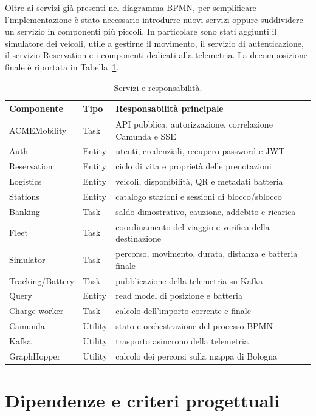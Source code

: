 \documentclass[12pt,a4paper,twoside]{report}
\begin{document}
Oltre ai servizi già presenti nel diagramma BPMN, per semplificare
l'implementazione è stato necessario introdurre nuovi servizi oppure
suddividere un servizio in componenti più piccoli. In particolare sono stati
aggiunti il simulatore dei veicoli, utile a gestirne il movimento, il servizio
di autenticazione, il servizio Reservation e i componenti dedicati alla
telemetria. La decomposizione finale è riportata in
Tabella~\ref{tab:servizi}.

\begin{table}[ht]
\centering
\small
\begin{tabularx}{\textwidth}{@{}l l X@{}}
\toprule
Componente & Tipo & Responsabilità principale \\
\midrule
ACMEMobility & Task & API pubblica, autorizzazione, correlazione Camunda e SSE \\
Auth & Entity & utenti, credenziali, recupero password e JWT \\
Reservation & Entity & ciclo di vita e proprietà delle prenotazioni \\
Logistics & Entity & veicoli, disponibilità, QR e metadati batteria \\
Stations & Entity & catalogo stazioni e sessioni di blocco/sblocco \\
Banking & Task & saldo dimostrativo, cauzione, addebito e ricarica \\
Fleet & Task & coordinamento del viaggio e verifica della destinazione \\
Simulator & Task & percorso, movimento, durata, distanza e batteria finale \\
Tracking/Battery & Task & pubblicazione della telemetria su Kafka \\
Query & Entity & read model di posizione e batteria \\
Charge worker & Task & calcolo dell'importo corrente e finale \\
Camunda & Utility & stato e orchestrazione del processo BPMN \\
Kafka & Utility & trasporto asincrono della telemetria \\
GraphHopper & Utility & calcolo dei percorsi sulla mappa di Bologna \\
\bottomrule
\end{tabularx}
\caption{Servizi e responsabilità.}
\label{tab:servizi}
\end{table}

\section{Dipendenze e criteri progettuali}
\end{document}
